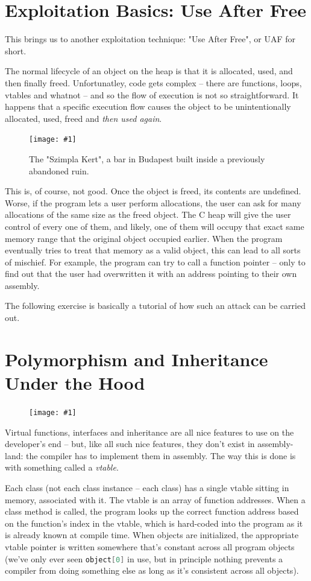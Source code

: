 \documentclass{article}
\newcommand{\wrapimagerightcap}[2] {
    \begin{figure}\begin{center}\texttt{[image: \#1]}\end{center}\caption{#2}\end{figure}}
\newcommand{\wrapimageright}[1] {
    \begin{figure}
        \begin{center}
            \texttt{[image: \#1]} 
        \end{center}
    \end{figure}
}
\newcommand{\xcode}[2]{\colorbox{ubuntuback}{\lstinline[language=#1]|#2|}}
\begin{document}
\section{Exploitation Basics: Use After Free}

This brings us to another exploitation technique: "Use After Free", or UAF for short.

The normal lifecycle of an object on the heap is that it is allocated, used, and then finally freed. Unfortunatley, code gets complex -- there are functions, loops, vtables and whatnot -- and so the flow of execution is not so straightforward. It happens that a specific execution flow causes the object to be unintentionally allocated, used, freed and \textit{then used again}.

\wrapimagerightcap{./images/szimpla_kert.jpg}{The "Szimpla Kert", a bar in Budapest built inside a previously abandoned ruin.}
This is, of course, not good. Once the object is freed, its contents are undefined. Worse, if the program lets a user perform allocations, the user can ask for many allocations of the same size as the freed object. The C heap will give the user control of every one of them, and likely, one of them will occupy that exact same memory range that the original object occupied earlier. When the program eventually tries to treat that memory as a valid object, this can lead to all sorts of mischief. For example, the program can try to call a function pointer -- only to find out that the user had overwritten it with an address pointing to their own assembly.

The following exercise is basically a tutorial of how such an attack can be carried out.

\section{Polymorphism and Inheritance Under the Hood}

\wrapimageright{./images/vtable_diagram.png}
Virtual functions, interfaces and inheritance are all nice features to use on the developer's end -- but, like all such nice features, they don't exist in assembly-land: the compiler has to implement them in assembly. The way this is done is with something called a \textit{vtable}.

Each class (not each class instance -- each class) has a single vtable sitting in memory, associated with it. The vtable is an array of function addresses. When a class method is called, the program looks up the correct function address based on the function's index in the vtable, which is hard-coded into the program as it is already known at compile time. When objects are initialized, the appropriate vtable pointer is written somewhere that's constant across all program objects (we've only ever seen \xcode{C}{object[0]} in use, but in principle nothing prevents a compiler from doing something else as long as it's consistent across all objects).
\end{document}

